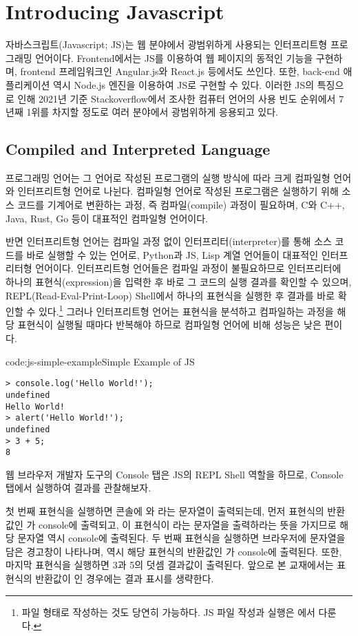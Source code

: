 \section{Introducing Javascript}\label{sect:introducing-javascript}

자바스크립트(Javascript; JS)는 웹 분야에서 광범위하게 사용되는 인터프리트형 프로그래밍 언어이다. Frontend에서는 JS를 이용하여 웹 페이지의 동적인 기능을 구현하며, frontend 프레임워크인 Angular.js와 React.js 등에서도 쓰인다. 또한, back-end 애플리케이션 역시 Node.js 엔진을 이용하여 JS로 구현할 수 있다. 이러한 JS의 특징으로 인해 2021년 기준 Stackoverflow에서 조사한 컴퓨터 언어의 사용 빈도 순위에서 7년째 1위를 차지할 정도로 여러 분야에서 광범위하게 응용되고 있다.

\subsection*{Compiled and Interpreted Language}

프로그래밍 언어는 그 언어로 작성된 프로그램의 실행 방식에 따라 크게 컴파일형 언어와 인터프리트형 언어로 나뉜다. 컴파일형 언어로 작성된 프로그램은 실행하기 위해 소스 코드를 기계어로 변환하는 과정, 즉 컴파일(compile) 과정이 필요하며, C와 C++, Java, Rust, Go 등이 대표적인 컴파일형 언어이다.

반면 인터프리트형 언어는 컴파일 과정 없이 인터프리터(interpreter)를 통해 소스 코드를 바로 실행할 수 있는 언어로, Python과 JS, Lisp 계열 언어들이 대표적인 인터프리터형 언어이다. 인터프리트형 언어들은 컴파일 과정이 불필요하므로 인터프리터에 하나의 표현식(expression)을 입력한 후 바로 그 코드의 실행 결과를 확인할 수 있으며, REPL(Read-Eval-Print-Loop) Shell에서 하나의 표현식을 실행한 후 결과를 바로 확인할 수 있다.\footnote{파일 형태로 작성하는 것도 당연히 가능하다. JS 파일 작성과 실행은 에서 다룬다.} 그러나 인터프리트형 언어는 표현식을 분석하고 컴파일하는 과정을 해당 표현식이 실행될 때마다 반복해야 하므로 컴파일형 언어에 비해 성능은 낮은 편이다.

\begin{codeenv}{code:js-simple-example}{Simple Example of JS}\begin{verbatim}
> console.log('Hello World!');
undefined
Hello World!
> alert('Hello World!');
undefined
> 3 + 5;
8
\end{verbatim}
\end{codeenv}

웹 브라우저 개발자 도구의 Console 탭은 JS의 REPL Shell 역할을 하므로, Console 탭에서 \을 실행하여 결과를 관찰해보자.

첫 번째 표현식을 실행하면 콘솔에 와 라는 문자열이 출력되는데, 먼저 표현식의 반환값인 가 console에 출력되고, 이 표현식이 라는 문자열을 출력하라는 뜻을 가지므로 해당 문자열 역시 console에 출력된다. 두 번째 표현식을 실행하면 브라우저에  문자열을 담은 경고창이 나타나며, 역시 해당 표현식의 반환값인 가 console에 출력된다. 또한, 마지막 표현식을 실행하면 3과 5의 덧셈 결과값이 출력된다. 앞으로 본 교재에서는 표현식의 반환값이 인 경우에는 결과 표시를 생략한다.
